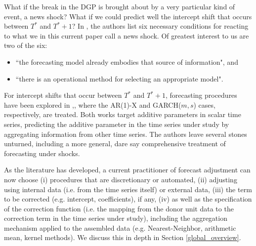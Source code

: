 \documentclass{uiucthesis2021}
\theoremstyle{definition}
\begin{document}
  What if the break in the DGP is brought about by a very particular kind of event, a news shock?   What if we could predict well the intercept shift that occurs between $T^{*}$ and $T^{*}+1$?  In \cite{castle2016overview}, the authors list six necessary conditions for reacting to what we in this current paper call a news shock.  Of greatest interest to us are two of the six: 
  
  \begin{itemize}
  \item ``the forecasting model already embodies that source of information", and 
  \item ``there is an operational method for selecting an appropriate model".
  \end{itemize}   
  
  For intercept shifts that occur between $T^{*}$ and $T^{*}+1$, forecasting procedures have been explored in \cite[][]{lin2021minimizing},\cite[][]{lundquist2024volatility}, where the AR(1)-X and GARCH($m,s$) cases, respectively, are treated.  Both works target additive parameters in scalar time series, predicting the additive parameter in the time series under study by aggregating information from other time series.  The authors leave several stones unturned, including a more general, dare say comprehensive treatment of forecasting under shocks.
  
  As the literature has developed, a current practitioner of forecast adjustment can now choose (i) procedures that are discretionary or automated, (ii) adjusting using internal data (i.e. from the time series itself) or external data, (iii) the term to be corrected (e.g. intercept, coefficients), if any, (iv) as well as the specification of the correction function (i.e. the mapping from the donor unit data to the correction term in the time series under study), including the aggregation mechanism applied to the assembled data (e.g. Nearest-Neighbor, arithmetic mean, kernel methods).  We discuss this in depth in Section \ref{global_overview}.
  
\end{document}
